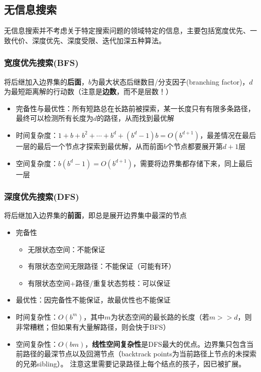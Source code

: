 \subsection{无信息搜索}
无信息搜索并不考虑关于特定搜索问题的领域特定的信息，主要包括宽度优先、一致代价、深度优先、深度受限、迭代加深五种算法。

\subsubsection{宽度优先搜索(BFS)}
将后继加入边界集的\textbf{后面}，$b$为最大状态后继数目/分支因子(branching factor)，$d$为最短距离解的行动数（注意是\textbf{边数}，而不是层数！）
\begin{itemize}
	\item 完备性与最优性：所有短路总在长路前被探索，某一长度只有有限多条路径，最终可以检测所有长度为$d$的路径，从而找到最优解
	\item 时间复杂度：$1+b+b^2+\cdots+b^d+(b^d-1)b=O(b^{d+1})$，最差情况在最后一层的最后一个节点才探索到最优解，从而前面$b$个节点都要展开第$d+1$层
	\item 空间复杂度：$b(b^d-1)=O(b^{d+1})$，需要将边界集都存储下来，同上最后一层
\end{itemize}

\subsubsection{深度优先搜索(DFS)}
将后继加入边界集的\textbf{前面}，即总是展开边界集中最深的节点
\begin{itemize}
	\item 完备性
	\begin{itemize}
		\item 无限状态空间：不能保证
		\item 有限状态空间无限路径：不能保证（可能有环）
		\item 有限状态空间+路径/重复状态剪枝：可以保证
	\end{itemize}
	\item 最优性：因完备性不能保证，故最优性也不能保证
	\item 时间复杂性：$O(b^m)$，其中$m$为状态空间的最长路的长度（若$m>>d$，则非常糟糕；但如果有大量解路径，则会快于BFS）
	\item 空间复杂性：$O(bm)$，\textbf{线性空间复杂性}是DFS最大的优点。边界集只包含当前路径的最深节点以及回溯节点（backtrack points为当前路径上节点的未探索的兄弟sibling）。
	注意这里需要记录路径上每个结点的孩子，因已被扩展。
\end{itemize}

